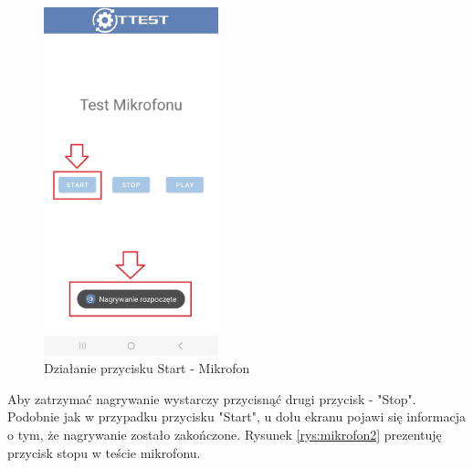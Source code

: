 \begin{figure}[!hbt]
	\begin{center}
		\includegraphics[angle=360, width=0.45\textwidth]{rys/punkt6/mikrofon1}
		\caption{Działanie przycisku Start - Mikrofon}
		\label{rys:mikrofon1}
	\end{center}
\end{figure}

\newpage


Aby zatrzymać nagrywanie wystarczy przycisnąć drugi przycisk - "Stop". \\ Podobnie jak w przypadku przycisku "Start", u dołu ekranu pojawi się informacja o tym, że nagrywanie zostało zakończone. Rysunek \ref{rys:mikrofon2} prezentuję przycisk stopu w teście mikrofonu.

